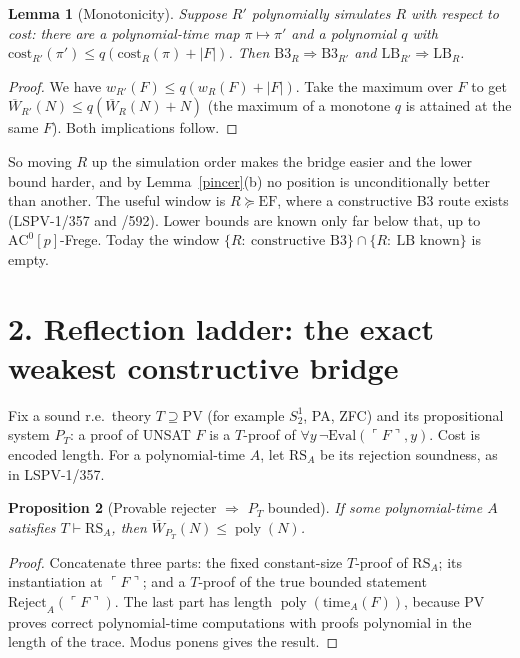 \documentclass[11pt]{article}
\newtheorem{lemma}{Lemma}
\newtheorem{proposition}[lemma]{Proposition}
\newcommand{\poly}{\operatorname{poly}}
\begin{document}
\begin{lemma}[Monotonicity]\label{mono}
Suppose $R'$ polynomially simulates $R$ with respect to cost: there are a polynomial-time map $\pi\mapsto\pi'$
and a polynomial $q$ with $\mathrm{cost}_{R'}(\pi')\le q(\mathrm{cost}_R(\pi)+|F|)$. Then
$\mathrm{B3}_R\Rightarrow\mathrm{B3}_{R'}$ and $\mathrm{LB}_{R'}\Rightarrow\mathrm{LB}_R$.
\end{lemma}
\begin{proof}
We have $w_{R'}(F)\le q(w_R(F)+|F|)$. Take the maximum over $F$ to get $\overline W_{R'}(N)\le q(\overline W_R(N)+N)$ (the maximum of a monotone $q$ is attained at the same $F$). Both implications follow.
\end{proof}
\noindent So moving $R$ up the simulation order makes the bridge easier and the lower bound harder, and
by Lemma~\ref{pincer}(b) no position is unconditionally better than another. The useful window is
$R\succeq\mathrm{EF}$, where a constructive B3 route exists (LSPV-1/357 and /592). Lower bounds are known only
far below that, up to $\mathrm{AC}^0[p]$-Frege. Today the window
$\{R:\ \text{constructive B3}\}\cap\{R:\ \text{LB known}\}$ is empty.

\section*{2. Reflection ladder: the exact weakest constructive bridge}
Fix a sound r.e.\ theory $T\supseteq\mathrm{PV}$ (for example $S^1_2$, PA, ZFC) and its propositional system
$P_T$: a proof of UNSAT $F$ is a $T$-proof of $\forall y\,\neg\mathrm{Eval}(\ulcorner F\urcorner,y)$.
Cost is encoded length. For a polynomial-time $A$, let $\mathrm{RS}_A$ be its rejection soundness, as in LSPV-1/357.

\begin{proposition}[Provable rejecter $\Rightarrow$ $P_T$ bounded]\label{up}
If some polynomial-time $A$ satisfies $T\vdash\mathrm{RS}_A$, then $\overline W_{P_T}(N)\le\poly(N)$.
\end{proposition}
\begin{proof}
Concatenate three parts: the fixed constant-size $T$-proof of $\mathrm{RS}_A$; its instantiation at $\ulcorner F\urcorner$; and a
$T$-proof of the true bounded statement $\mathrm{Reject}_A(\ulcorner F\urcorner)$. The last part has length $\poly(\mathrm{time}_A(F))$, because
PV proves correct polynomial-time computations with proofs polynomial in the length of the trace. Modus ponens gives the result.
\end{proof}
\end{document}
